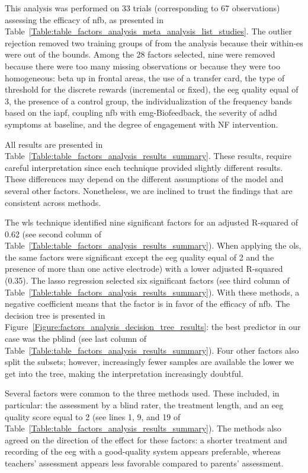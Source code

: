 This analysis was performed on 33 trials (corresponding to 67 observations) assessing the efficacy of \gls{nfb}, as presented 
in Table~\ref{Table:table_factors_analysis_meta_analysis_list_studies}. The outlier rejection removed two training groups
of \citet{Bazanova2018} from the analysis because their within-\gls{es} were out of the bounds. Among the 28 
factors selected, nine were removed because there were too many missing observations or because they were too homogeneous: beta up in frontal areas, 
the use of a transfer card, the type of threshold for the discrete rewards (incremental or fixed), the \gls{eeg} quality equal of 3, the 
presence of a control group, the individualization of the frequency bands based on the \gls{iapf}, coupling 
\gls{nfb} with \gls{emg}-Biofeedback, the severity of \gls{adhd} symptoms at baseline, and the degree of engagement with NF intervention.  

All results are presented in Table~\ref{Table:table_factors_analysis_results_summary}. These results, require 
careful interpretation since each technique provided slightly different results. These differences 
may depend on the different assumptions of the model and several other factors. Nonetheless, we are inclined to 
trust the findings that are consistent across methods. 

The \gls{wls} technique identified nine significant factors for an adjusted R-squared of 0.62 (see second column of 
Table~\ref{Table:table_factors_analysis_results_summary}). 
When applying the \gls{ols}, the same factors were significant except the \gls{eeg} quality equal of 2 and the presence of more than one active electrode)
with a lower adjusted R-squared (0.35). The \gls{lasso} regression selected six significant factors (see third column of 
Table~\ref{Table:table_factors_analysis_results_summary}). With these methods, a negative coefficient means 
that the factor is in favor of the efficacy of \gls{nfb}. The decision tree is presented in Figure~\ref{Figure:factors_analysis_decision_tree_results}: 
the best predictor in our case was the \gls{pblind} (see last column of 
Table~\ref{Table:table_factors_analysis_results_summary}). Four other factors also split the subsets; however, 
increasingly fewer samples are available the lower we get into the tree, making the interpretation increasingly doubtful.  

Several factors were common to the three methods used. These included, in particular: the assessment 
by a blind rater, the treatment length, and an \gls{eeg} quality score equal to 2 (see lines 1, 9, and 19 of 
Table~\ref{Table:table_factors_analysis_results_summary}).
The methods also agreed on the direction of the effect for these factors: 
a shorter treatment and recording of the \gls{eeg} with a good-quality system appears preferable, whereas teachers' assessment appears less favorable 
compared to parents' assessment.

